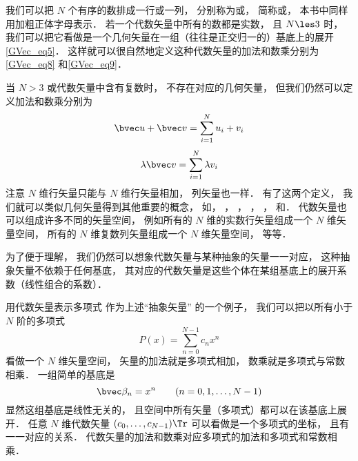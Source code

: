 

我们可以把 $N$ 个有序的数排成一行或一列， 分别称为或， 简称或， 本书中同样用加粗正体字母表示． 若一个代数矢量中所有的数都是实数， 且 $N \les 3$%
时， 我们可以把它看做是一个几何矢量在一组（往往是正交归一的）基底上的展开\autoref{GVec_eq5}． 这样就可以很自然地定义这种代数矢量的加法和数乘分别为\autoref{GVec_eq8} 和\autoref{GVec_eq9}．

当 $N > 3$ 或代数矢量中含有复数时， 不存在对应的几何矢量， 但我们仍然可以定义加法和数乘分别为
\begin{equation}
\bvec u + \bvec v = \sum_{i = 1}^N u_i + v_i
\end{equation}
\begin{equation}
\lambda \bvec v = \sum_{i = 1}^N \lambda v_i
\end{equation}
注意 $N$ 维行矢量只能与 $N$ 维行矢量相加， 列矢量也一样． 有了这两个定义， 我们就可以类似几何矢量得到其他重要的概念， 如， ， ， ， ， 和． 代数矢量也可以组成许多不同的矢量空间， 例如所有的 $N$ 维的实数行矢量组成一个 $N$ 维矢量空间， 所有的 $N$ 维复数列矢量组成一个 $N$ 维矢量空间， 等等．

为了便于理解， 我们仍然可以想象代数矢量与某种抽象的矢量一一对应， 这种抽象矢量不依赖于任何基底， 其对应的代数矢量是这些个体在某组基底上的展开系数（线性组合的系数）．

\begin{exam}{用代数矢量表示多项式}
作为上述“抽象矢量” 的一个例子， 我们可以把以所有小于 $N$ 阶的多项式
\begin{equation}
P(x) = \sum_{n = 0}^{N-1} c_n x^n
\end{equation}
看做一个 $N$ 维矢量空间， 矢量的加法就是多项式相加， 数乘就是多项式与常数相乘． 一组简单的基底是
\begin{equation}
\bvec \beta_n = x^n \qquad (n = 0, 1, \dots, N-1)
\end{equation}
显然这组基底是线性无关的， 且空间中所有矢量（多项式）都可以在该基底上展开． 任意 $N$ 维代数矢量 $(c_0, \dots, c_{N-1})\Tr$ 可以看做是一个多项式的坐标， 且有一一对应的关系． 代数矢量的加法和数乘对应多项式的加法和多项式和常数相乘．
\end{exam}

